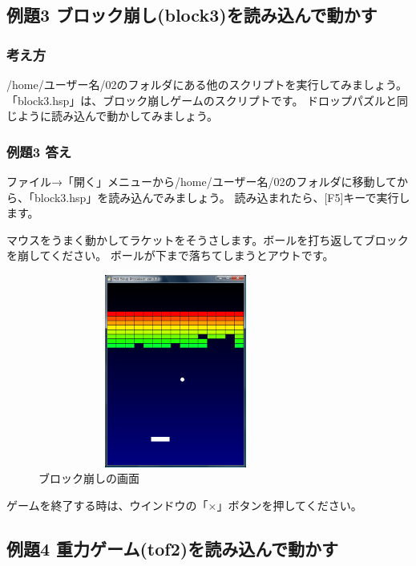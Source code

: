 % 
% 
% 
\subsection{例題3 ブロック崩し(block3)を読み込んで動かす}

\subsubsection*{考え方}

/home/ユーザー名/02のフォルダにある他のスクリプトを実行してみましょう。
「block3.hsp」は、ブロック崩しゲームのスクリプトです。
ドロップパズルと同じように読み込んで動かしてみましょう。

\subsubsection*{例題3 答え}

ファイル→「開く」メニューから/home/ユーザー名/02のフォルダに移動してから、「block3.hsp」を読み込んでみましょう。
読み込まれたら、[F5]キーで実行します。

マウスをうまく動かしてラケットをそうさします。ボールを打ち返してブロックを崩してください。
ボールが下まで落ちてしまうとアウトです。

\begin{figure}[H]
  \begin{center}
    \includegraphics[keepaspectratio,width=9.049cm,height=6.346cm]{images/chap02/text02-img016.png}
    \caption{ブロック崩しの画面}
  \end{center}
  \label{fig:block_display}
\end{figure}

ゲームを終了する時は、ウインドウの「×」ボタンを押してください。
\clearpage

% 
% 
% 
\subsection{例題4 重力ゲーム(tof2)を読み込んで動かす}

